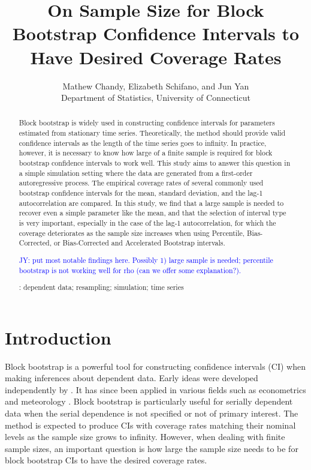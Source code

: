 \documentclass[12pt, letterpaper, titlepage]{article}
\title{On Sample Size for Block Bootstrap Confidence Intervals 
  to Have Desired Coverage Rates}
\author{Mathew Chandy, Elizabeth Schifano,
  and Jun Yan\\[1ex]
  Department of Statistics, University of Connecticut\\
}
\date{}
\newcommand{\jy}[1]{\textcolor{blue}{JY: #1}}
\begin{document}
 
\maketitle

\begin{abstract}
Block bootstrap is widely used in constructing confidence intervals for
parameters estimated from stationary time series. Theoretically, the method
should provide valid confidence intervals as the length of the time series goes
to infinity. In practice, however, it is necessary to know how large of a finite
sample is required for block bootstrap confidence intervals to work well. This
study aims to answer this question in a simple simulation setting where the data
are generated from a first-order autoregressive process. The empirical coverage
rates of several commonly used bootstrap confidence intervals for the mean,
standard deviation, and the lag-1 autocorrelation are compared. In this 
study, we find that a large sample is needed to recover even a simple
parameter like the mean, and that the selection of interval type is very
important, especially in the case of the lag-1 autocorrelation, for which the coverage
deteriorates as the sample size increases when using Percentile, 
Bias-Corrected, or Bias-Corrected and Accelerated Bootstrap intervals.

\jy{put most
  notable findings here. Possibly 1) large sample is needed; percentile
  bootstrap is not working well for rho (can we offer some explanation?).}

\bigskip
{}:
dependent data; resampling; simulation; time series
\end{abstract}

\doublespace

\section{Introduction}
\label{sec:intro}

Block bootstrap is a powerful tool for constructing confidence intervals (CI)
when making inferences about dependent data. Early ideas were developed
independently by \citet{hall1985resampling, carlstein1986use, kunsch1989jackknife}.
It has since been applied in various fields such as econometrics
\citep{mackinnon2006bootstrap} and meteorology \citep{varga2017generalised}.
Block bootstrap is particularly useful for serially dependent
data when the serial dependence is not specified or not of primary interest.
The method is expected to produce CIs with coverage rates
matching their nominal levels as the sample size grows to infinity. However,
when dealing with finite sample sizes, an important question is how large the
sample size needs to be for block bootstrap CIs to have the
desired coverage rates.
\end{document}
